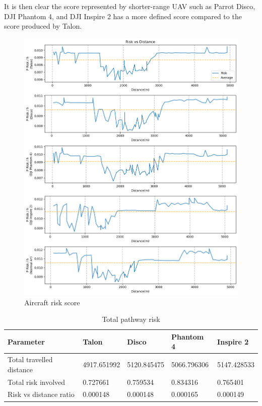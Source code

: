 \documentclass[12pt]{report}
\begin{document}
        It is then clear the score represented by shorter-range UAV such as Parrot Disco, DJI Phantom 4, and DJI
        Inspire 2 has a more defined score compared to the score produced by Talon.

        \begin{figure}[H]
            \centering
            \includegraphics[width=\textwidth]{Plot/risk_vs_distance.png}
            \caption{Aircraft risk score}
        \end{figure}

        \begin{table}[H]
            \caption{Total pathway risk} %
            \centering
            \begin{tabular}{| l  l  l  l  l |}
                \hline
                \textbf{Parameter} & \textbf{Talon} & \textbf{Disco} & \textbf{Phantom 4} & \textbf{Inspire 2} \\
                \hline
                Total travelled distance & 4917.651992 & 5120.845475 & 5066.796306 & 5147.428533 \\
                Total risk involved & 0.727661 & 0.759534 & 0.834316 & 0.765401 \\
                Risk vs distance ratio & 0.000148 & 0.000148 & 0.000165 & 0.000149 \\
                \hline
            \end{tabular}
        \end{table}
\end{document}
